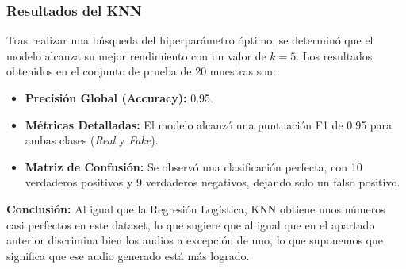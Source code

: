 \subsubsection*{Resultados del KNN}

Tras realizar una búsqueda del hiperparámetro óptimo, se determinó que el modelo alcanza su mejor rendimiento con un valor de $k=5$. Los resultados obtenidos en el conjunto de prueba de 20 muestras son:

\begin{itemize}
    \item \textbf{Precisión Global (Accuracy):} 0.95.
    \item \textbf{Métricas Detalladas:} El modelo alcanzó una puntuación F1 de 0.95 para ambas clases (\textit{Real} y \textit{Fake}).
    \item \textbf{Matriz de Confusión:} Se observó una clasificación perfecta, con 10 verdaderos positivos y 9 verdaderos negativos, dejando solo un falso positivo.
\end{itemize}

\textbf{Conclusión:} Al igual que la Regresión Logística, KNN obtiene unos números casi perfectos en este dataset, lo que sugiere que al igual que en el apartado anterior discrimina bien los audios a excepción de uno, lo que suponemos que significa que ese audio generado está más logrado.
